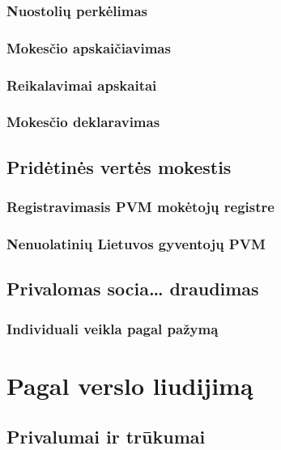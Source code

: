 \subsubsection{Nuostolių perkėlimas}

\subsubsection{Mokesčio apskaičiavimas}

\subsubsection{Reikalavimai apskaitai}

\subsubsection{Mokesčio deklaravimas}

\subsection{Pridėtinės vertės mokestis}

\subsubsection{Registravimasis PVM mokėtojų registre}

\subsubsection{Nenuolatinių Lietuvos gyventojų PVM}

\subsection{Privalomas socia… draudimas}

\subsubsection{Individuali veikla pagal pažymą}

\section{Pagal verslo liudijimą}

\subsection{Privalumai ir trūkumai}

